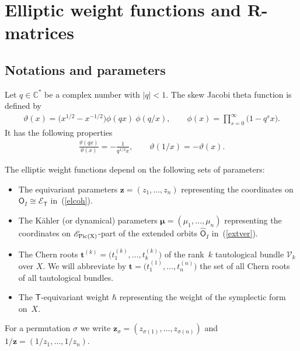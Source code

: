 \documentclass[10pt,a4paper]{amsart}
\def\C{{\mathbb C}}
\newcommand{\bT}{\mathsf{T}}
\newcommand{\Or}{\textsf{O}}
\newcommand{\cE}{\mathscr{E}}
\def\ttt{{\boldsymbol t}}
\def\zz{{\boldsymbol z}}
\def\mub{{\boldsymbol\mu}}
\newcommand{\cV}{\mathcal{V}}
\let\thi\vartheta
\let\pho\phi
\numberwithin{equation}{section}
\begin{document}
\section[Elliptic weight functions and $R$-matrices]{Elliptic weight functions and $\boldsymbol{R}$-matrices}\label{sec:2}

\subsection{Notations and parameters} \label{notesec}
Let $q\in \C^*$ be a complex number with $|q|<1$. The skew Jacobi theta function is defined by
\begin{gather*}%
\thi(x)=\big(x^{1/2}-x^{-1/2}\big)\pho(qx)\>\pho(q/x),\qquad \pho(x)=\prod_{s=0}^\infty\big(1-q^s x\big).
\end{gather*}
It has the following properties
\begin{gather*}%
\frac{\thi(qx)}{\thi(x)}=-\frac1{q^{1/2}x},\qquad\thi(1/x)=-\thi(x).
\end{gather*}

The elliptic weight functions depend on the following sets of parameters:
\begin{itemize}\itemsep=0pt
\item The equivariant parameters $\zz=(z_{1},\dots, z_{n})$ representing the coordinates on $\Or_I\cong \cE_{\bT}$ in~(\ref{elcoh}).
\item The K\"ahler (or dynamical) parameters $\mub=(\mu_{1},\dots, \mu_{n})$ representing the coordinates on $\cE_{\rm{Pic}(X)}$-part of the extended orbits $\widehat{\Or}_{I}$ in~(\ref{extver}).

\item The Chern roots $\ttt^{(k)} = \big(t^{(k)}_{1},\dots, t^{(k)}_{k}\big)$ of the rank~$k$ tautological bundle $\cV_k$ over $X$. We will abbreviate by $\ttt=\big(t^{(1)}_{1},\dots,t^{(n)}_{n}\big)$ the set of all Chern roots of all tautological bundles.

\item The $\bT$-equivariant weight $\hbar$ representing the weight of the symplectic form on~$X$.
\end{itemize}

For a permutation $\sigma$ we write $\zz_{\sigma}=(z_{\sigma(1)},\dots,z_{\sigma(n)})$ and $1/\zz=(1/z_1,\dots,1/z_n)$.
\end{document}
